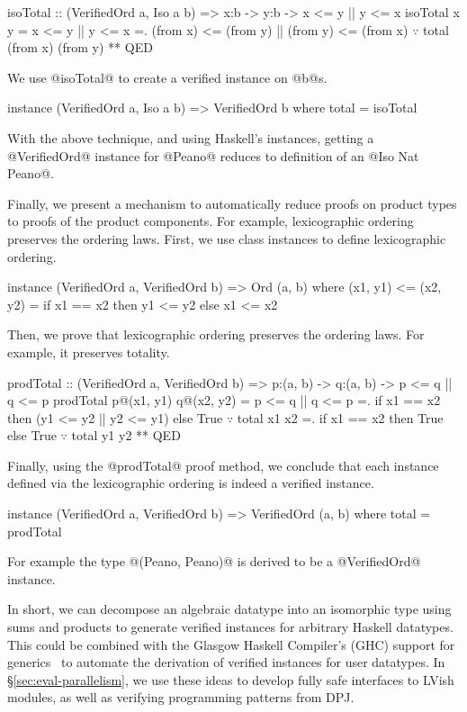 \begin{mcode}
  isoTotal :: (VerifiedOrd a, Iso a b)
             => x:b -> y:b -> {x <= y || y <= x}
  isoTotal x y
   =  x <= y || y <= x
   =. (from x) <= (from y) || (from y) <= (from x)
      $\because$ total (from x) (from y)
   ** QED
\end{mcode}
%
We use @isoTotal@ to create a verified instance on @b@s.
\begin{mcode}
  instance (VerifiedOrd a, Iso a b)
        => VerifiedOrd b where
    total   = isoTotal
\end{mcode}
%
With the above technique,
and using Haskell's instances,
getting a @VerifiedOrd@ instance for @Peano@
reduces to definition of an @Iso Nat Peano@.

Finally, we present a mechanism to automatically
reduce proofs on product types to proofs of the product components.
%
For example, lexicographic ordering preserves the ordering laws.
%
First, we use class instances to define lexicographic ordering.
%
\begin{mcode}
  instance (VerifiedOrd a, VerifiedOrd b)
        => Ord (a, b) where
    (x1, y1) <= (x2, y2) =
      if x1 == x2 then y1 <= y2 else x1 <= x2
\end{mcode}
%
Then, we prove that lexicographic ordering
preserves the ordering laws.
%
For example, it preserves totality.
%
\begin{mcode}
  prodTotal :: (VerifiedOrd a, VerifiedOrd b)
    => p:(a, b) -> q:(a, b) -> {p <= q || q <= p}
  prodTotal p@(x1, y1) q@(x2, y2)
   =  p <= q || q <= p
   =. if x1 == x2 then (y1 <= y2 || y2 <= y1)
                  else True $\because$ total x1 x2
   =. if x1 == x2 then True
                  else True $\because$ total y1 y2
   ** QED
\end{mcode}
%
Finally, using the @prodTotal@ proof method,
we conclude that each instance defined via the lexicographic
ordering is indeed a verified instance.
%
\begin{mcode}
instance (VerifiedOrd a, VerifiedOrd b)
      => VerifiedOrd (a, b) where
  total   = prodTotal
\end{mcode}
%
For example the type @(Peano, Peano)@ is derived to be a @VerifiedOrd@ instance.

In short, we can decompose an algebraic datatype into an isomorphic type using sums and
products to generate verified instances for arbitrary Haskell
datatypes. This could be combined with the Glasgow Haskell Compiler's (GHC) support
for generics~\cite{ghc-generics} to automate the derivation of verified instances
for user datatypes.
In \S\ref{sec:eval-parallelism}, we use these ideas to develop fully safe
interfaces to LVish modules, as well as verifying programming patterns from DPJ.









